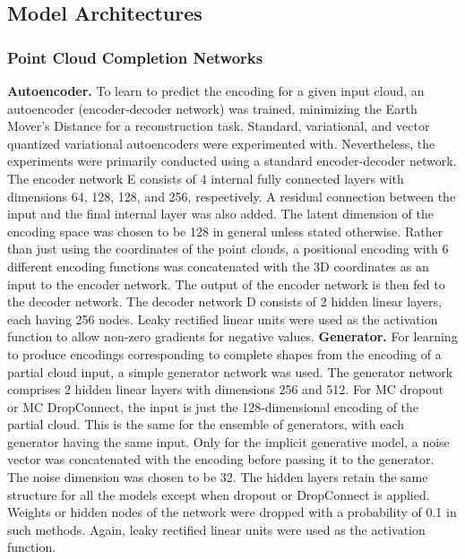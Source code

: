     \subsection{Model Architectures}

        \subsubsection{Point Cloud Completion Networks}
        \textbf{Autoencoder.} 
        To learn to predict the encoding for a given input cloud, an autoencoder (encoder-decoder network) was trained, minimizing the Earth Mover's Distance for a reconstruction task. Standard, variational, and vector quantized variational autoencoders were experimented with. Nevertheless, the experiments were primarily conducted using a standard encoder-decoder network. The encoder network E consists of 4 internal fully connected layers with dimensions 64, 128, 128, and 256, respectively. A residual connection between the input and the final internal layer was also added. The latent dimension of the encoding space was chosen to be 128 in general unless stated otherwise. Rather than just using the coordinates of the point clouds, a positional encoding with 6 different encoding functions was concatenated with the 3D coordinates as an input to the encoder network. The output of the encoder network is then fed to the decoder network. The decoder network D consists of 2 hidden linear layers, each having 256 nodes. Leaky rectified linear units were used as the activation function to allow non-zero gradients for negative values.
        \newline \textbf{Generator.}
        For learning to produce encodings corresponding to complete shapes from the encoding of a partial cloud input, a simple generator network was used. The generator network comprises 2 hidden linear layers with dimensions 256 and 512. For MC dropout or MC DropConnect, the input is just the 128-dimensional encoding of the partial cloud. This is the same for the ensemble of generators, with each generator having the same input. Only for the implicit generative model, a noise vector was concatenated with the encoding before passing it to the generator. The noise dimension was chosen to be 32. The hidden layers retain the same structure for all the models except when dropout or DropConnect is applied. Weights or hidden nodes of the network were dropped with a probability of 0.1 in such methods. Again, leaky rectified linear units were used as the activation function.
        
